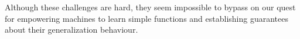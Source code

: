 Although these challenges are hard, they seem impossible to bypass on our quest for empowering machines to learn simple functions and establishing guarantees about their generalization behaviour.

%
%
